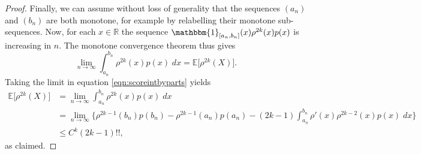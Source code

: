 \documentclass[aos]{imsart}
\newcommand{\ind}{\mathbbm{1}}
\newcommand{\R}{\mathbb{R}}
\newcommand{\E}{\mathbb{E}}
\begin{document}
\begin{proof}
		Finally, we can assume without loss of generality that the sequences $(a_n)$ and $(b_n)$ are both monotone, for example by relabelling their monotone sub-sequences. Now, for each $x\in\R$ the sequence $\ind_{[a_n,b_n]}(x)\rho^{2k}(x)p(x)$ is increasing in $n$. The monotone convergence theorem thus gives \begin{equation*}
			\lim_{n\to\infty} \int_{a_n}^{b_n} \rho^{2k}(x)p(x)\; dx = \E\big[\rho^{2k}(X)\big].
		\end{equation*}
		Taking the limit in equation \eqref{eqn:scoreintbyparts} yields \begin{align*}
			\E\big[\rho^{2k}(X)\big] &= \lim_{n\to\infty} \int_{a_n}^{b_n} \rho^{2k}(x)p(x)\; dx \\
			&= \lim_{n\to\infty} \bigg\{\rho^{2k-1}(b_n)p(b_n)-\rho^{2k-1}(a_n)p(a_n) - (2k-1)\int_{a_n}^{b_n}  \rho'(x)\rho^{2k-2}(x)p(x)\; dx\bigg\}\\
			&\leq C^k(2k-1)!!,
		\end{align*}
		as claimed.
	\end{proof}
	
	
	
	
\end{document}
